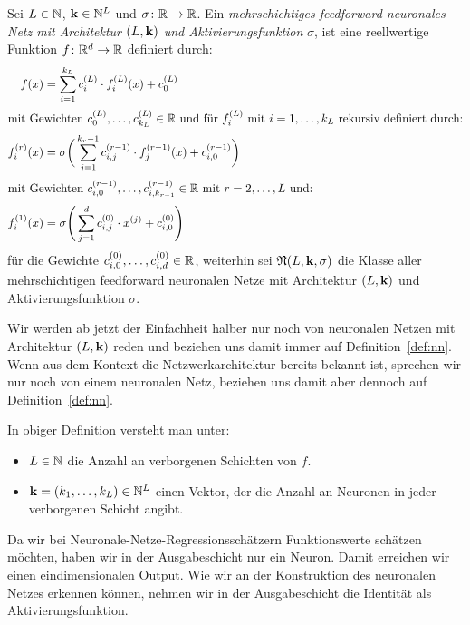 \begin{defn}
\label{def:nn}
Sei $L \in \mathbb{N}$, $\mathbf{k} \in \mathbb{N}^L$ und $\sigma\colon \mathbb{R} \to \mathbb{R}$. Ein \emph{mehrschichtiges feedforward neuronales Netz mit Architektur $(L, \mathbf{k})$ und Aktivierungsfunktion} $\sigma$, ist eine reellwertige Funktion $f\colon \mathbb{R}^d \to \mathbb{R}$ definiert durch:
\begin{align}
\label{networkarch}
f(x) & = \sum_{i = 1}^{k_L} c_i^{(L)} \cdot f_i^{(L)}(x) + c_0^{(L)} \nonumber \\
\intertext{mit Gewichten $c_0^{(L)},\dots,c_{k_L}^{(L)} \in \mathbb{R}$ und für $f_i^{(L)}$ mit $i = 1,\dots,k_L$ rekursiv definiert durch:} 
f_i^{(r)}(x) & = \sigma \bigg(\sum_{j = 1}^{k_r - 1} c_{i,j}^{(r - 1)} \cdot f_j^{(r - 1)}(x) + c_{i,0}^{(r - 1)} \bigg)\\
\intertext{mit Gewichten $c_{i,0}^{(r - 1)},\dots,c_{i,k_{r - 1}}^{(r - 1)} \in \mathbb{R}$ mit $r = 2,\dots, L$ und:}
f_i^{(1)}(x) & = \sigma \Bigg(\sum_{j = 1}^{d} c_{i,j}^{(0)} \cdot x^{(j)} + c_{i,0}^{(0)} \Bigg) \nonumber
\end{align} 
für die Gewichte $c_{i,0}^{(0)},\dots,c_{i,d}^{(0)} \in \mathbb{R}$,
weiterhin sei $\mathfrak{N}(L, \mathbf{k}, \sigma)$ die Klasse aller mehrschichtigen feedforward neuronalen Netze mit Architektur $(L, \mathbf{k})$ und Aktivierungsfunktion $\sigma$.
\end{defn}
Wir werden ab jetzt der Einfachheit halber nur noch von neuronalen Netzen mit Architektur $(L,\mathbf{k})$ reden und beziehen uns damit immer auf Definition~\ref{def:nn}. Wenn aus dem Kontext die Netzwerkarchitektur bereits bekannt ist, sprechen wir nur noch von einem neuronalen Netz, beziehen uns damit aber dennoch auf Definition~\ref{def:nn}.
\begin{bemnumber}
In obiger Definition versteht man unter:
\begin{itemize}
\item $L \in \mathbb{N}$ die Anzahl an verborgenen Schichten von $f$.
\item $\mathbf{k} = (k_1,\dots,k_L) \in \mathbb{N}^L$ einen Vektor, der die Anzahl an Neuronen in jeder verborgenen Schicht angibt.
\end{itemize}
\end{bemnumber}
Da wir bei Neuronale-Netze-Regressionsschätzern Funktionswerte schätzen möchten, haben wir in der Ausgabeschicht nur ein Neuron. Damit erreichen wir einen eindimensionalen Output. Wie wir an der Konstruktion des neuronalen Netzes erkennen können, nehmen wir in der Ausgabeschicht die Identität als Aktivierungsfunktion.

